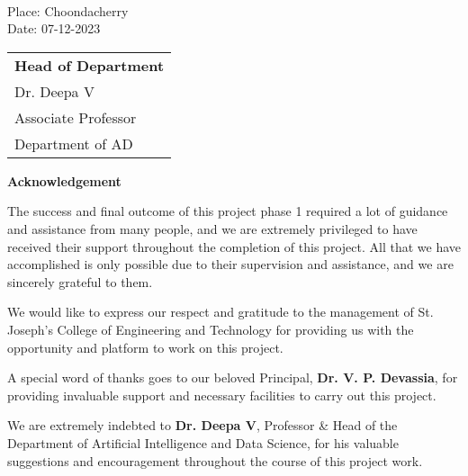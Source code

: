 {\vspace{1.3 cm}\\
\begin{minipage}[t]{0.5\textwidth}
\begin{flushleft}
\setlength{\leftskip}{0pt} %
\vspace{0.1 cm}
Place: Choondacherry \\
Date: 07-12-2023
\end{flushleft}
\end{minipage}%
\begin{minipage}[t]{0.49\textwidth}
\begin{flushright}
\begin{tabular}{l}
\textbf{Head of Department} \\
Dr. Deepa V \\
Associate Professor \\
Department of AD
\end{tabular}
\end{flushright}
\end{minipage}
                

\newpage
\thispagestyle{empty}
\begin{center}
  \vspace*{1cm}
  \textbf{\large Acknowledgement}
\end{center}
The success and final outcome of this project phase 1 required a lot of guidance and assistance from many people, and we are extremely privileged to have received their support throughout the completion of this project. All that we have accomplished is only possible due to their supervision and assistance, and we are sincerely grateful to them.

\noindent
We would like to express our respect and gratitude to the management of St. Joseph’s College of Engineering and Technology for providing us with the opportunity and platform to work on this project.

\noindent
A special word of thanks goes to our beloved Principal, \textbf{Dr. V. P. Devassia}, for providing invaluable support and necessary facilities to carry out this project.

\noindent
We are extremely indebted to \textbf{Dr. Deepa V}, Professor \& Head of the Department of Artificial Intelligence and Data Science, for his valuable suggestions and encouragement throughout the course of this project work.

}
